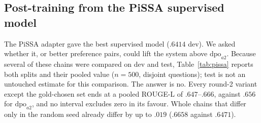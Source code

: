 \documentclass[11pt,a4paper]{article}
\newcommand{\rl}{ROUGE-L}
\begin{document}
\subsection{Post-training from the PiSSA supervised model}\label{sec:pissa}
The PiSSA adapter gave the best supervised model ($.6414$ dev). We asked whether it, or better preference pairs, could lift the system above $\mathrm{dpo}_{a2}$. Because several of these chains were compared on dev and test, Table~\ref{tab:pissa} reports both splits and their pooled value ($n{=}500$, disjoint questions); test is not an untouched estimate for this comparison. The answer is no. Every round-2 variant except the gold-chosen set ends at a pooled \rl{} of $.647$--$.666$, against $.656$ for $\mathrm{dpo}_{a2}$, and no interval excludes zero in its favour. Whole chains that differ only in the random seed already differ by up to $.019$ ($.6658$ against $.6471$).
\end{document}
